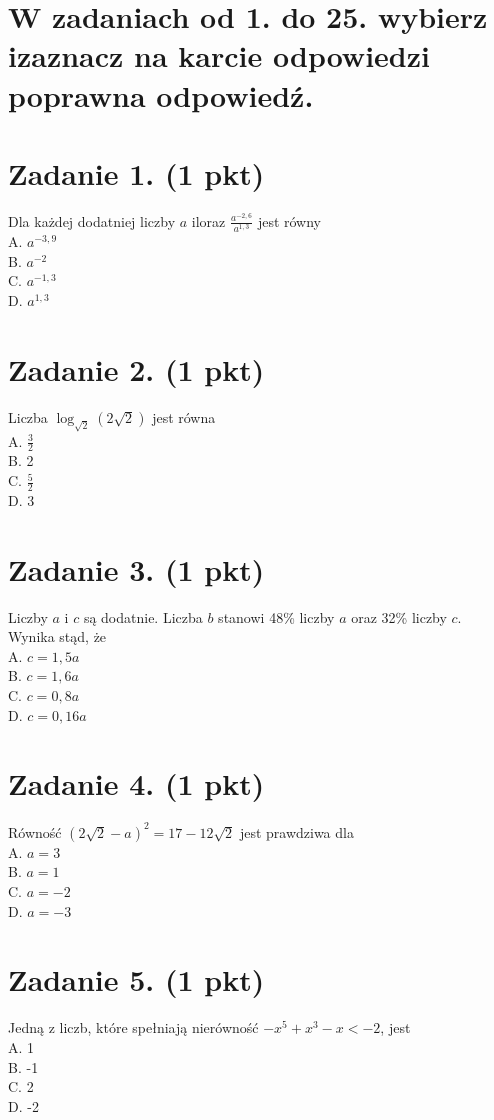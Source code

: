 \documentclass[10pt]{article}
\begin{document}
\section*{W zadaniach od 1. do 25. wybierz izaznacz na karcie odpowiedzi poprawna odpowiedź.}
\section*{Zadanie 1. (1 pkt)}
Dla każdej dodatniej liczby \(a\) iloraz \(\frac{a^{-2,6}}{a^{1,3}}\) jest równy\\
A. \(a^{-3,9}\)\\
B. \(a^{-2}\)\\
C. \(a^{-1,3}\)\\
D. \(a^{1,3}\)

\section*{Zadanie 2. (1 pkt)}
Liczba \(\log _{\sqrt{2}}(2 \sqrt{2})\) jest równa\\
A. \(\frac{3}{2}\)\\
B. 2\\
C. \(\frac{5}{2}\)\\
D. 3

\section*{Zadanie 3. (1 pkt)}
Liczby \(a\) i \(c\) są dodatnie. Liczba \(b\) stanowi 48\% liczby \(a\) oraz 32\% liczby \(c\). Wynika stąd, że\\
A. \(c=1,5 a\)\\
B. \(c=1,6 a\)\\
C. \(c=0,8 a\)\\
D. \(c=0,16 a\)

\section*{Zadanie 4. (1 pkt)}
Równość \((2 \sqrt{2}-a)^{2}=17-12 \sqrt{2}\) jest prawdziwa dla\\
A. \(a=3\)\\
B. \(a=1\)\\
C. \(a=-2\)\\
D. \(a=-3\)

\section*{Zadanie 5. (1 pkt)}
Jedną z liczb, które spełniają nierówność \(-x^{5}+x^{3}-x<-2\), jest\\
A. 1\\
B. -1\\
C. 2\\
D. -2
\end{document}
